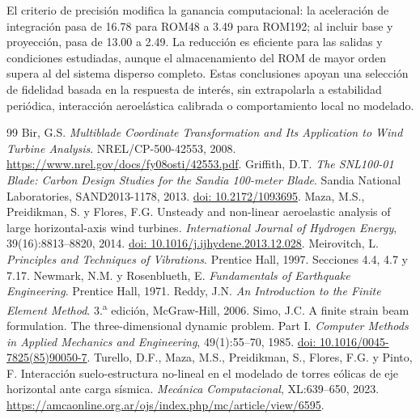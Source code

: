 \documentclass[oneside,a4paper,spanish,links,pagenumbers]{amca}
\newcommand{\doi}[1]{\href{https://doi.org/#1}{doi: #1}}
\begin{document}
El criterio de precisión modifica la ganancia computacional: la aceleración de integración pasa de 16.78 para ROM48 a 3.49 para ROM192; al incluir base y proyección, pasa de 13.00 a 2.49. La reducción es eficiente para las salidas y condiciones estudiadas, aunque el almacenamiento del ROM de mayor orden supera al del sistema disperso completo. Estas conclusiones apoyan una selección de fidelidad basada en la respuesta de interés, sin extrapolarla a estabilidad periódica, interacción aeroelástica calibrada o comportamiento local no modelado.

\appendix


\begin{thebibliography}{99}
 Bir, G.S. \emph{Multiblade Coordinate Transformation and Its Application to Wind Turbine Analysis}. NREL/CP-500-42553, 2008. \url{https://www.nrel.gov/docs/fy08osti/42553.pdf}.
 Griffith, D.T. \emph{The SNL100-01 Blade: Carbon Design Studies for the Sandia 100-meter Blade}. Sandia National Laboratories, SAND2013-1178, 2013. \doi{10.2172/1093695}.
 Maza, M.S., Preidikman, S. y Flores, F.G. Unsteady and non-linear aeroelastic analysis of large horizontal-axis wind turbines. \emph{International Journal of Hydrogen Energy}, 39(16):8813--8820, 2014. \doi{10.1016/j.ijhydene.2013.12.028}.
 Meirovitch, L. \emph{Principles and Techniques of Vibrations}. Prentice Hall, 1997. Secciones 4.4, 4.7 y 7.17.
 Newmark, N.M. y Rosenblueth, E. \emph{Fundamentals of Earthquake Engineering}. Prentice Hall, 1971.
 Reddy, J.N. \emph{An Introduction to the Finite Element Method}. 3.\textsuperscript{a} edición, McGraw-Hill, 2006.
 Simo, J.C. A finite strain beam formulation. The three-dimensional dynamic problem. Part I. \emph{Computer Methods in Applied Mechanics and Engineering}, 49(1):55--70, 1985. \doi{10.1016/0045-7825(85)90050-7}.
 Turello, D.F., Maza, M.S., Preidikman, S., Flores, F.G. y Pinto, F. Interacción suelo-estructura no-lineal en el modelado de torres eólicas de eje horizontal ante carga sísmica. \emph{Mecánica Computacional}, XL:639--650, 2023. \url{https://amcaonline.org.ar/ojs/index.php/mc/article/view/6595}.
\end{thebibliography}
\end{document}
